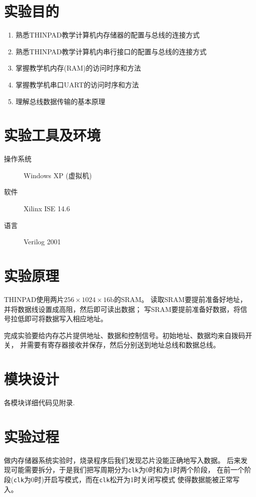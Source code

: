 \title{}
\author{宋方睿~刘啸宇~吴育昕}
\date{\the{}\the{}\the{}}
\maketitle
\tableofcontents

\section{实验目的}
\begin{enumerate}
  \item 熟悉THINPAD教学计算机内存储器的配置与总线的连接方式
  \item 熟悉THINPAD教学计算机内串行接口的配置与总线的连接方式
  \item 掌握教学机内存(RAM)的访问时序和方法
  \item 掌握教学机串口UART的访问时序和方法
  \item 理解总线数据传输的基本原理
\end{enumerate}

\section{实验工具及环境}
\begin{description}
  \item[操作系统] Windows XP (虚拟机)
  \item[软件] Xilinx ISE 14.6
  \item[语言] Verilog 2001
\end{description}

\section{实验原理}
THINPAD使用两片$256\times 1024\times 16\mathrm{b}$的SRAM。
读取SRAM要提前准备好地址，并将数据线设置成高阻，然后即可读出数据；
写SRAM要提前准备好数据，将信号拉低即可将数据写入相应地址。

完成实验要给内存芯片提供地址、数据和控制信号。初始地址、数据均来自拨码开关，
并需要有寄存器接收并保存，然后分别送到地址总线和数据总线。


\section{模块设计}

各模块详细代码见附录.

\section{实验过程}
做内存储器系统实验时，烧录程序后我们发现芯片没能正确地写入数据。
后来发现可能需要拆分，于是我们把写周期分为\texttt{clk}为0时和为1时两个阶段，
在前一个阶段(\texttt{clk}为0时)开启写模式，而在\texttt{clk}松开为1时关闭写模式
使得数据能被正常写入。

